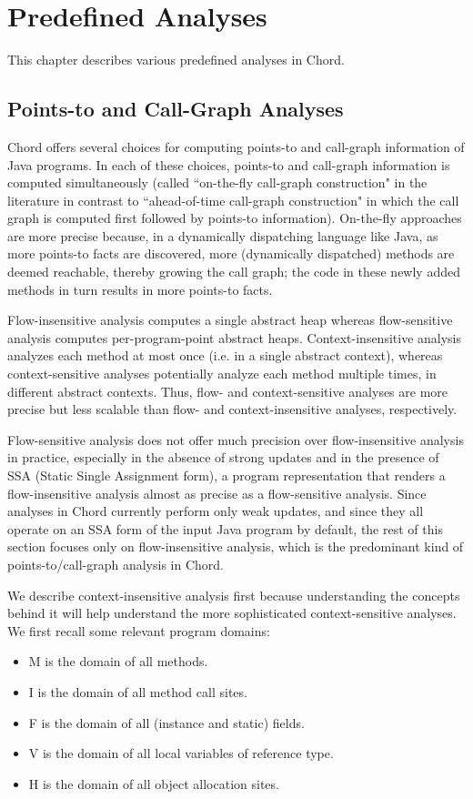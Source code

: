 \chapter{Predefined Analyses}
\label{chap:predefined-analyses}

This chapter describes various predefined analyses in Chord.

\section{Points-to and Call-Graph Analyses}

Chord offers several choices for computing points-to and call-graph information of Java programs.
In each of these choices, points-to and call-graph information is computed simultaneously
(called ``on-the-fly call-graph construction" in the literature in contrast to ``ahead-of-time call-graph
construction" in which the call graph is computed first followed by points-to information).
On-the-fly approaches are more precise because, in a dynamically dispatching language like Java,
as more points-to facts are discovered, more (dynamically dispatched) methods are deemed reachable,
thereby growing the call graph; the code in these newly added methods in turn results in more
points-to facts.

Flow-insensitive analysis computes a single abstract heap whereas flow-sensitive analysis computes
per-program-point abstract heaps.  Context-insensitive analysis analyzes each method at most once (i.e. in a single abstract context),
whereas context-sensitive analyses potentially analyze each method multiple times, in different abstract contexts.
Thus, flow- and context-sensitive analyses are more precise but less scalable than flow- and context-insensitive
analyses, respectively.

Flow-sensitive analysis does not offer much precision over flow-insensitive analysis in
practice, especially in the absence of strong updates and in the presence of SSA (Static Single Assignment form),
a program representation that renders a flow-insensitive analysis almost as precise as a flow-sensitive analysis.
Since analyses in Chord currently perform only weak updates, and since they all operate on an SSA form of the
input Java program by default, the rest of this section focuses only on flow-insensitive analysis, which is the predominant
kind of points-to/call-graph analysis in Chord.

We describe context-insensitive analysis first because understanding the concepts behind it will help understand
the more sophisticated context-sensitive analyses.
We first recall some relevant program domains:
\begin{itemize}
\item M is the domain of all methods.
\item I is the domain of all method call sites.
\item F is the domain of all (instance and static) fields.
\item V is the domain of all local variables of reference type.
\item H is the domain of all object allocation sites.
\end{itemize}

